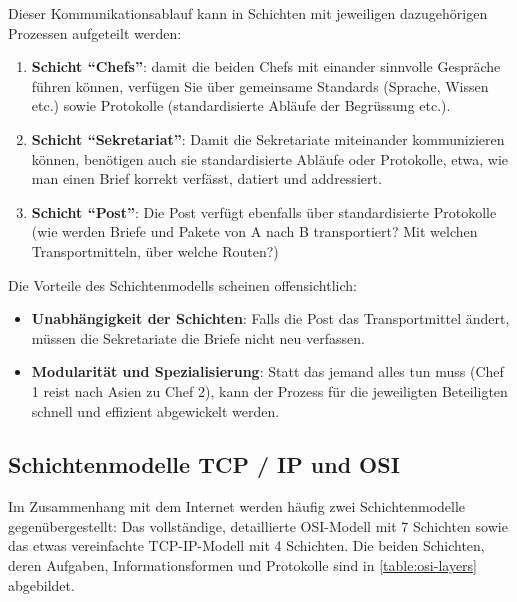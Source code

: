 Dieser Kommunikationsablauf kann in Schichten mit jeweiligen dazugehörigen Prozessen aufgeteilt werden:
\begin{enumerate}
	\item \textbf{Schicht \enquote{Chefs}}: damit die beiden Chefs mit einander sinnvolle Gespräche führen können, verfügen Sie über gemeinsame Standards (Sprache, Wissen etc.) sowie Protokolle (standardisierte Abläufe der Begrüssung etc.).
	\item \textbf{Schicht \enquote{Sekretariat}}: Damit die Sekretariate miteinander kommunizieren können, benötigen auch sie standardisierte Abläufe oder Protokolle, etwa, wie man einen Brief korrekt verfässt, datiert und addressiert.
	\item \textbf{Schicht \enquote{Post}}: Die Post verfügt ebenfalls über standardisierte Protokolle (wie werden Briefe und Pakete von A nach B transportiert? Mit welchen Transportmitteln, über welche Routen?)
\end{enumerate}
Die Vorteile des Schichtenmodells scheinen offensichtlich:
\begin{itemize}
	\item \textbf{Unabhängigkeit der Schichten}: Falls die Post das Transportmittel ändert, müssen die Sekretariate die Briefe nicht neu verfassen.
	\item \textbf{Modularität und Spezialisierung}: Statt das jemand alles tun muss (Chef 1 reist nach Asien zu Chef 2), kann der Prozess für die jeweiligten Beteiligten schnell und effizient abgewickelt werden.
\end{itemize}

\subsection{\texorpdfstring{Schichtenmodelle \acrshort{TCP} / \acrshort{IP} und \acrshort{OSI}}{TCP / IP und OSI}}

Im Zusammenhang mit dem Internet werden häufig zwei Schichtenmodelle gegenübergestellt: Das vollständige, detaillierte \acrfull{OSI}-Modell mit 7 Schichten sowie das etwas vereinfachte \acrfull{TCP}-\acrfull{IP}-Modell mit 4 Schichten. Die beiden Schichten, deren Aufgaben, Informationsformen und Protokolle sind in \cref{table:osi-layers} abgebildet.


\begin{table}[H]
	\centering
	\footnotesize
	
	\label{table:osi-layers}
	\caption{Internet-Schichten-Modelle \gls{OSI} und \gls{TCP}-\gls{IP} sowie deren wichtigste Aufgaben, Informationsformen, Geräte und Protokolle}
\end{table}

